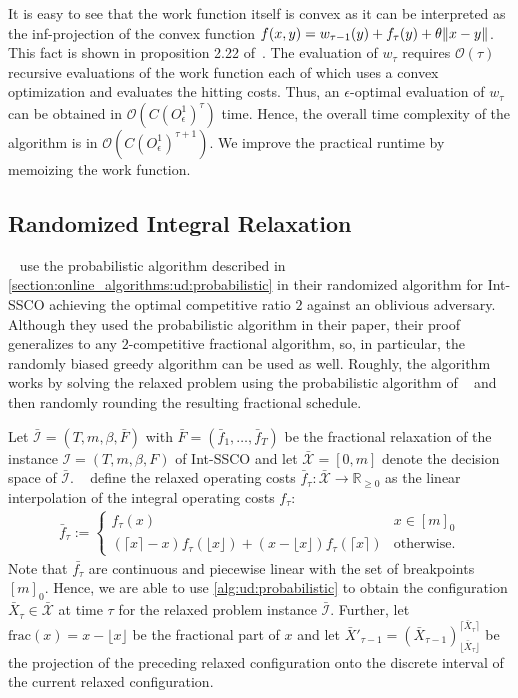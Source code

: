 It is easy to see that the work function itself is convex as it can be interpreted as the inf-projection of the convex function $f(x,y) = w_{\tau-1}(y) + f_{\tau}(y) + \theta \lVert x - y\rVert$. This fact is shown in proposition 2.22 of~\cite{Burke2015}. The evaluation of $w_{\tau}$ requires $\mathcal{O}(\tau)$ recursive evaluations of the work function each of which uses a convex optimization and evaluates the hitting costs. Thus, an $\epsilon$-optimal evaluation of $w_{\tau}$ can be obtained in $\mathcal{O}(C (O_{\epsilon}^1)^{\tau})$ time. Hence, the overall time complexity of the algorithm is in $\mathcal{O}(C (O_{\epsilon}^1)^{\tau+1})$. We improve the practical runtime by memoizing the work function.

\subsection{Randomized Integral Relaxation}

\citeauthor{Albers2018}~\cite{Albers2018} use the probabilistic algorithm described in \cref{section:online_algorithms:ud:probabilistic} in their randomized algorithm for Int-SSCO achieving the optimal competitive ratio $2$ against an oblivious adversary. Although they used the probabilistic algorithm in their paper, their proof generalizes to any $2$-competitive fractional algorithm, so, in particular, the randomly biased greedy algorithm can be used as well. Roughly, the algorithm works by solving the relaxed problem using the probabilistic algorithm of \citeauthor{Bansal2015}~\cite{Bansal2015} and then randomly rounding the resulting fractional schedule.

Let $\bar{\mathcal{I}} = (T, m, \beta, \bar{F})$ with $\bar{F} = (\bar{f}_1, \dots, \bar{f}_T)$ be the fractional relaxation of the instance $\mathcal{I} = (T, m, \beta, F)$ of Int-SSCO and let $\bar{\mathcal{X}} = [0,m]$ denote the decision space of $\bar{\mathcal{I}}$. \citeauthor{Albers2018}~\cite{Albers2018} define the relaxed operating costs $\bar{f}_{\tau} : \bar{\mathcal{X}} \to \mathbb{R}_{\geq 0}$ as the linear interpolation of the integral operating costs $f_{\tau}$: \begin{align*}
    \bar{f}_{\tau} := \begin{cases}
        f_{\tau}(x) & x \in [m]_0 \\
        (\lceil x \rceil - x) f_{\tau}(\lfloor x \rfloor) + (x - \lfloor x \rfloor) f_{\tau}(\lceil x \rceil) & \text{otherwise}.
    \end{cases}
\end{align*} Note that $\bar{f_{\tau}}$ are continuous and piecewise linear with the set of breakpoints $[m]_0$. Hence, we are able to use \cref{alg:ud:probabilistic} to obtain the configuration $\bar{X}_{\tau} \in \bar{\mathcal{X}}$ at time $\tau$ for the relaxed problem instance  $\bar{\mathcal{I}}$. Further, let $\text{frac}(x) = x - \lfloor x \rfloor$ be the fractional part of $x$ and let $\bar{X}'_{\tau-1} = (\bar{X}_{\tau-1})_{\lfloor\bar{X}_{\tau}\rfloor}^{\lceil\bar{X}_{\tau}\rceil}$ be the projection of the preceding relaxed configuration onto the discrete interval of the current relaxed configuration.

